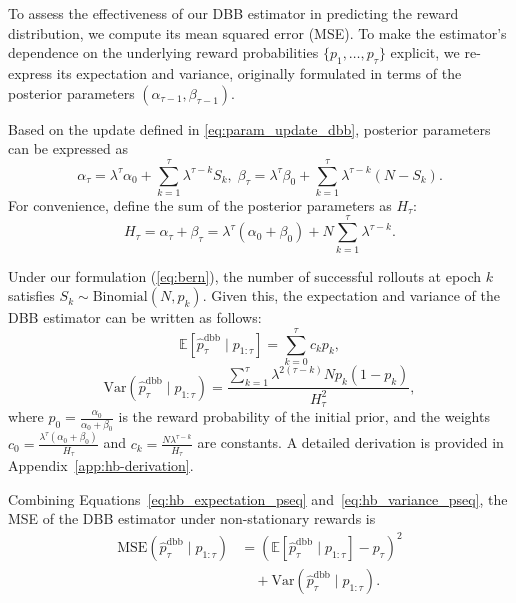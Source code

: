 
To assess the effectiveness of our DBB estimator in predicting the reward distribution, we compute its mean squared error (MSE). To make the estimator's dependence on the underlying reward probabilities $\{p_1, \ldots, p_\tau\}$ explicit, we re-express its expectation and variance, originally formulated in terms of the posterior parameters $(\alpha_{\tau-1}, \beta_{\tau-1})$.

Based on the update defined in \cref{eq:param_update_dbb}, posterior parameters can be expressed as
\[
\alpha_\tau = \lambda^\tau \alpha_0 + \sum_{k=1}^{\tau} \lambda^{\tau-k} S_k,
\;
\beta_\tau = \lambda^\tau \beta_0 + \sum_{k=1}^{\tau} \lambda^{\tau-k} (N - S_k).
\]
For convenience, define the sum of the posterior parameters as $H_\tau$:
\begin{equation}
H_\tau = \alpha_\tau + \beta_\tau = \lambda^\tau(\alpha_0+\beta_0) + N\sum_{k=1}^{\tau}\lambda^{\tau-k}.
\end{equation}

Under our formulation (\cref{eq:bern}), the number of successful rollouts at epoch $k$ satisfies $S_k \sim \mathrm{Binomial}(N, p_k)$. Given this, the expectation and variance of the DBB estimator can be written as follows:
\begin{equation}
\mathbb{E}\!\left[\hat{p}_\tau^{\mathrm{dbb}} \mid p_{1:\tau} \right]
= \sum_{k=0}^{\tau} c_k p_k,
\label{eq:hb_expectation_pseq}
\end{equation}
\begin{equation}
\mathrm{Var}\!\left(\hat{p}_\tau^{\mathrm{dbb}} \mid p_{1:\tau} \right)
=
\frac{\sum_{k=1}^{\tau} \lambda^{2(\tau-k)} N p_k(1-p_k)}{H_\tau^2},
\label{eq:hb_variance_pseq}
\end{equation}
where $p_0=\frac{\alpha_0}{\alpha_0+\beta_0}$ is the reward probability of the initial prior, and the weights $c_0=\frac{\lambda^\tau(\alpha_0 + \beta_0)}{H_\tau}$ and $c_k=\frac{N \lambda^{\tau-k}}{H_\tau}$ are constants. A detailed derivation is provided in Appendix~\ref{app:hb-derivation}.

Combining Equations~\eqref{eq:hb_expectation_pseq} and~\eqref{eq:hb_variance_pseq}, the MSE of the DBB estimator under non-stationary rewards is
\begin{equation}
\begin{split}
\mathrm{MSE}\!\left(\hat{p}_\tau^{\mathrm{dbb}} \mid p_{1:\tau} \right)
&=
\left(\mathbb{E}\!\left[\hat{p}_\tau^{\mathrm{dbb}} \mid p_{1:\tau} \right] - p_\tau \right)^2 \\
&\quad+
\mathrm{Var}\!\left(\hat{p}_\tau^{\mathrm{dbb}} \mid p_{1:\tau} \right).
\end{split}
\label{eq:hb_mse_pseq}
\end{equation}


